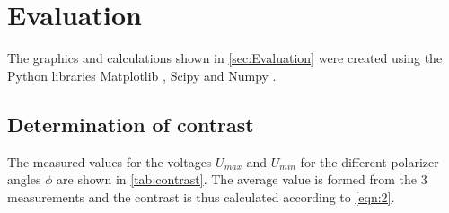 \section{Evaluation}
\label{sec:Evaluation}
The graphics and calculations shown in \autoref{sec:Evaluation} were created using the Python libraries Matplotlib \cite{matplotlib}, Scipy \cite{scipy} and Numpy \cite{numpy}.

\subsection{Determination of contrast}
The measured values for the voltages $U_{max}$ and $U_{min}$ for the different polarizer angles $\phi$ are shown in \autoref{tab:contrast}. 
The average value is formed from the 3 measurements and the contrast is thus calculated according to \autoref{eqn:2}.

